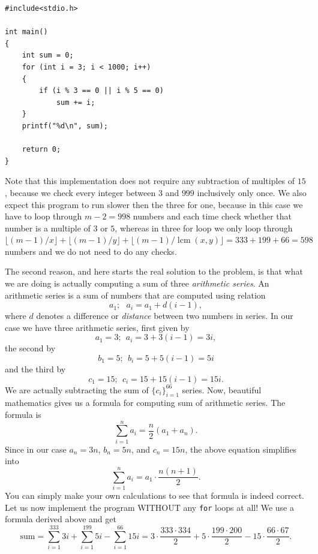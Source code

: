 \documentclass{book}
\DeclareMathOperator{\lcm}{lcm}
\begin{document}
\begin{verbatim}
#include<stdio.h>

int main()
{
    int sum = 0;
    for (int i = 3; i < 1000; i++)
    {
        if (i % 3 == 0 || i % 5 == 0)
            sum += i;
    }
    printf("%d\n", sum);
    
    return 0;
}
\end{verbatim}

Note that this implementation does not require any subtraction of multiples of $15$, because we check every integer between $3$ and $999$ inclusively only once. We also expect this program to run slower then the three for one, because in this case we have to loop through $m - 2 = 998$ numbers and each time check whether that number is a multiple of $3$ or $5$, whereas in three for loop we only loop through $\lfloor(m - 1)/x\rfloor + \lfloor(m - 1)/y\rfloor + \lfloor(m - 1)/ \lcm(x, y)\rfloor = 333 + 199 + 66 = 598$ numbers and we do not need to do any checks.

The second reason, and here starts the real solution to the problem, is that what we are doing is actually computing a sum of three \textit{arithmetic series}. An arithmetic series is a sum of numbers that are computed using relation \[a_1;~~~a_i = a_1 + d(i-1),\] where $d$ denotes a difference or \textit{distance} between two numbers in series. In our case we have three arithmetic series, first given by \[a_1 = 3;~~a_i = 3 + 3(i-1) = 3i,\] the second by \[b_1 = 5;~~b_i = 5 + 5(i-1) = 5i\] and the third by \[c_1 = 15;~~c_i = 15 + 15(i-1) = 15i.\] We are actually subtracting the sum of $\{c_i\}_{i = 1}^{66}$ series.
Now, beautiful mathematics gives us a formula for computing sum of arithmetic series. The formula is \[\sum_{i=1}^n a_i = \frac{n}{2}(a_1 + a_n).\] Since in our case $a_n = 3n$, $b_n = 5n$, and $c_n = 15n$, the above equation simplifies into \[\sum_{i=1}^n a_i = a_1 \cdot \frac{n(n+1)}{2}.\] You can simply make your own calculations to see that formula is indeed correct. Let us now implement the program WITHOUT any \texttt{for} loops at all! We use a formula derived above and get \[\textrm{sum} = \sum_{i=1}^{333} 3i + \sum_{i=1}^{199} 5i - \sum_{i=1}^{66} 15i = 3\cdot\frac{333\cdot334}{2} + 5\cdot\frac{199\cdot200}{2} - 15\cdot\frac{66\cdot67}{2}.\]
\end{document}
